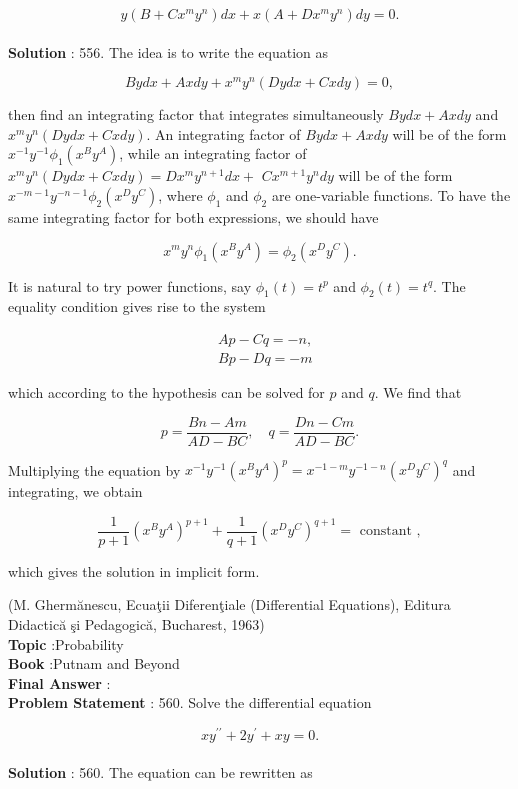 \documentclass[10pt]{article}
\begin{document}
$$
y\left(B+C x^{m} y^{n}\right) d x+x\left(A+D x^{m} y^{n}\right) d y=0 .
$$
\\
\textbf{Solution} :
556. The idea is to write the equation as

$$
B y d x+A x d y+x^{m} y^{n}(D y d x+C x d y)=0,
$$

then find an integrating factor that integrates simultaneously $B y d x+A x d y$ and $x^{m} y^{n}(D y d x+C x d y)$. An integrating factor of $B y d x+A x d y$ will be of the form $x^{-1} y^{-1} \phi_{1}\left(x^{B} y^{A}\right)$, while an integrating factor of $x^{m} y^{n}(D y d x+C x d y)=D x^{m} y^{n+1} d x+$ $C x^{m+1} y^{n} d y$ will be of the form $x^{-m-1} y^{-n-1} \phi_{2}\left(x^{D} y^{C}\right)$, where $\phi_{1}$ and $\phi_{2}$ are one-variable functions. To have the same integrating factor for both expressions, we should have

$$
x^{m} y^{n} \phi_{1}\left(x^{B} y^{A}\right)=\phi_{2}\left(x^{D} y^{C}\right) .
$$

It is natural to try power functions, say $\phi_{1}(t)=t^{p}$ and $\phi_{2}(t)=t^{q}$. The equality condition gives rise to the system

$$
\begin{aligned}
&A p-C q=-n, \\
&B p-D q=-m
\end{aligned}
$$

which according to the hypothesis can be solved for $p$ and $q$. We find that

$$
p=\frac{B n-A m}{A D-B C}, \quad q=\frac{D n-C m}{A D-B C} .
$$

Multiplying the equation by $x^{-1} y^{-1}\left(x^{B} y^{A}\right)^{p}=x^{-1-m} y^{-1-n}\left(x^{D} y^{C}\right)^{q}$ and integrating, we obtain

$$
\frac{1}{p+1}\left(x^{B} y^{A}\right)^{p+1}+\frac{1}{q+1}\left(x^{D} y^{C}\right)^{q+1}=\text { constant },
$$

which gives the solution in implicit form.

(M. Ghermănescu, Ecuaţii Diferenţiale (Differential Equations), Editura Didactică şi Pedagogică, Bucharest, 1963)
\\
\textbf{Topic} :Probability\\
\textbf{Book} :Putnam and Beyond\\
\textbf{Final Answer} :\\


\textbf{Problem Statement} :
560. Solve the differential equation

$$
x y^{\prime \prime}+2 y^{\prime}+x y=0 .
$$
\\
\textbf{Solution} :
560. The equation can be rewritten as
\end{document}
